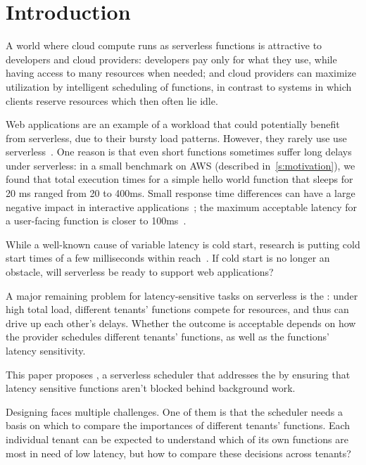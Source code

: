 \section{Introduction}
\label{s:intro}

A world where cloud compute runs as serverless functions is attractive to
developers and cloud providers: developers pay only for what they use, while having
access to many resources when needed; and cloud providers can maximize
utilization by intelligent scheduling of functions, in contrast to systems in
which clients reserve resources which then often lie idle.

Web applications are an example of a workload that could potentially benefit
from serverless, due to their bursty load patterns. However, they rarely use use
serverless~\cite{reddit-serverless1, reddit-serverless2, not-lambda-blog}. One
reason is that even short functions sometimes suffer long delays under
serverless: in a small benchmark on AWS (described in~\autoref{s:motivation}), we found that total execution times for a
simple hello world function that sleeps for 20 ms ranged from 20 to 400ms. Small
response time differences can have a large negative impact in interactive
applications~\cite{amz-page-load,google-page-load}; the maximum acceptable
latency for a user-facing function is closer to 100ms~\cite{page-load-time}.

While a well-known cause of variable latency is cold start, research is putting
cold start times of a few milliseconds within reach~\cite{sigmaos,mitosis}. If
cold start is no longer an obstacle, will serverless be ready to support web
applications?

A major remaining problem for latency-sensitive tasks on serverless is the
\emph{\problem{}}: under high total load, different tenants' functions compete
for resources, and thus can drive up each other's delays. Whether the outcome is
acceptable depends on how the provider schedules different tenants' functions,
as well as the functions' latency sensitivity.

This paper proposes \sys{}, a serverless scheduler that addresses the \problem{}
by ensuring that latency sensitive functions aren't blocked behind background
work.

Designing \sys{} faces multiple challenges. One of them is that the scheduler
needs a basis on which to compare the importances of different tenants'
functions. Each individual tenant can be expected to understand which of its own
functions are most in need of low latency, but how to compare these decisions
across tenants?

